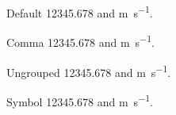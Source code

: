 \documentclass{article}
\begin{document}
Default \num{12345.678} and \unit{\metre\per\second}.

Comma \num{12345.678} and \unit{\metre\per\second}.

Ungrouped \num{12345.678} and \unit{\metre\per\second}.

Symbol \num{12345.678} and \unit{\metre\per\second}.
\end{document}
